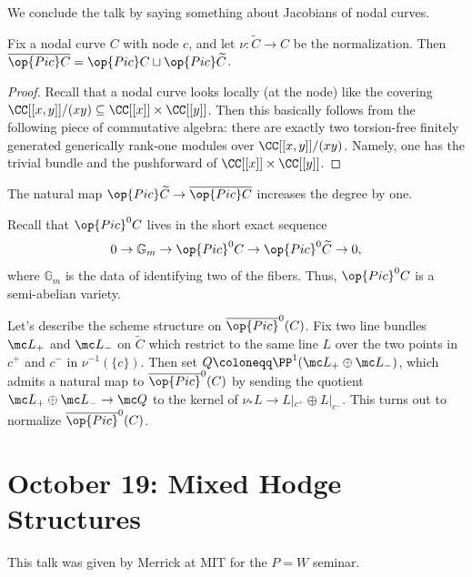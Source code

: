 \documentclass{article}
\begin{document}
We conclude the talk by saying something about Jacobians of nodal curves.
\begin{proposition}
	Fix a nodal curve $C$ with node $c$, and let $\nu\colon\widetilde C\to C$ be the normalization. Then $\overline{\op{Pic}C}=\op{Pic}C\sqcup\op{Pic}\widetilde C$.
\end{proposition}
\begin{proof}
	Recall that a nodal curve looks locally (at the node) like the covering $\CC[[x,y]]/(xy)\subseteq\CC[[x]]\times\CC[[y]]$. Then this basically follows from the following piece of commutative algebra: there are exactly two torsion-free finitely generated generically rank-one modules over $\CC[[x,y]]/(xy)$. Namely, one has the trivial bundle and the pushforward of $\CC[[x]]\times\CC[[y]]$.
\end{proof}
\begin{remark}
	The natural map $\op{Pic}\widetilde C\to\overline{\op{Pic}C}$ increases the degree by one.
\end{remark}
\begin{remark}
	Recall that $\op{Pic}^0C$ lives in the short exact sequence
	\[0\to\mathbb G_m\to\op{Pic}^0C\to\op{Pic}^0\widetilde C\to0,\]
	where $\mathbb G_m$ is the data of identifying two of the fibers. Thus, $\op{Pic}^0C$ is a semi-abelian variety.
\end{remark}
\begin{remark}
	Let's describe the scheme structure on $\overline{\op{Pic}}^0(C)$. Fix two line bundles $\mc L_+$ and $\mc L_-$ on $\widetilde C$ which restrict to the same line $L$ over the two points in $c^+$ and $c^-$ in $\nu^{-1}(\{c\})$. Then set $Q\coloneqq\PP^1(\mc L_+\oplus\mc L_-)$, which admits a natural map to $\overline{\op{Pic}}^0(C)$ by sending the quotient $\mc L_+\oplus\mc L_-\to\mc Q$ to the kernel of $\nu_*L\to L|_{c^+}\oplus L|_{c^-}$. This turns out to normalize $\overline{\op{Pic}}^0(C)$.
\end{remark}

\section{October 19: Mixed Hodge Structures}
This talk was given by Merrick at MIT for the $P=W$ seminar.
\end{document}

